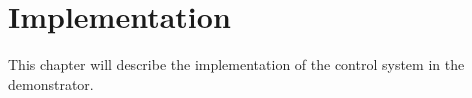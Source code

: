 \chapter{Implementation}
This chapter will describe the implementation of the control system in the demonstrator.
